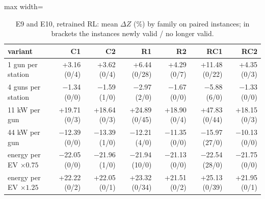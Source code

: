 \begin{table}[H]\centering
\small
\caption{E9 and E10, retrained RL: mean $\Delta Z$ (\%) by family on paired instances; in brackets the instances newly valid / no longer valid.}\label{tab:rlfam}
\begin{adjustbox}{max width=\textwidth}\begin{tabular}{lrrrrrr}\toprule
variant & C1 & C2 & R1 & R2 & RC1 & RC2 \\ \midrule
1 gun per station & +3.16 (0/4) & +3.62 (0/4) & +6.44 (0/28) & +4.29 (0/7) & +11.48 (0/22) & +4.35 (0/3) \\
4 guns per station & $-$1.34 (0/0) & $-$1.59 (1/0) & $-$2.97 (2/0) & $-$1.67 (0/0) & $-$5.88 (6/0) & $-$1.33 (0/0) \\
11 kW per gun & +19.71 (0/3) & +18.64 (0/3) & +24.89 (0/45) & +18.90 (0/4) & +47.83 (0/44) & +18.15 (0/3) \\
44 kW per gun & $-$12.39 (0/0) & $-$13.39 (1/0) & $-$12.21 (4/0) & $-$11.35 (0/0) & $-$15.97 (27/0) & $-$10.13 (0/0) \\
energy per EV $\times0.75$ & $-$22.05 (0/0) & $-$21.96 (1/0) & $-$21.94 (10/0) & $-$21.13 (0/0) & $-$22.54 (28/0) & $-$21.75 (0/0) \\
energy per EV $\times1.25$ & +22.22 (0/2) & +22.05 (0/1) & +23.32 (0/34) & +21.51 (0/2) & +25.13 (0/39) & +21.95 (0/1) \\
\bottomrule\end{tabular}\end{adjustbox}\end{table}
